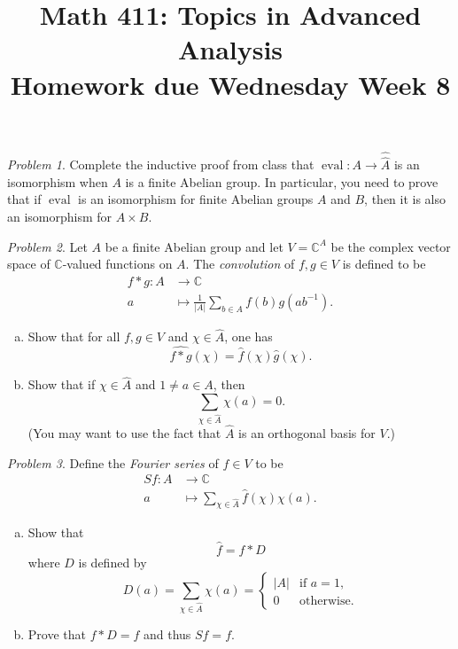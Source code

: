\documentclass[11pt,twoside]{amsart}
\title{Math 411: Topics in Advanced Analysis\\ Homework due Wednesday Week 8}
\theoremstyle{plain}
\theoremstyle{remark}
\newtheorem{prob}{Problem}
\theoremstyle{definition}
\theoremstyle{definition}
\newcommand{\CC}{\mathbb{C}}
\newcommand{\eval}{\operatorname{eval}}
\begin{document}
\maketitle

\begin{prob}
Complete the inductive proof from class that $\eval\colon A\to \hat{\hat A}$ is an isomorphism when $A$ is a finite Abelian group. In particular, you need to prove that if $\eval$ is an isomorphism for finite Abelian groups $A$ and $B$, then it is also an isomorphism for $A\times B$.
\end{prob}

\begin{prob}
Let $A$ be a finite Abelian group and let $V = \CC^A$ be the complex vector space of $\CC$-valued functions on $A$. The \emph{convolution} of $f,g\in V$ is defined to be
\[
\begin{aligned}
  f*g\colon A&\longrightarrow \CC\\
  a&\longmapsto \frac{1}{|A|}\sum_{b\in A}f(b)g(ab^{-1}).
\end{aligned}
\]
\begin{enumerate}[(a)]
\item Show that for all $f,g\in V$ and $\chi\in \hat A$, one has
\[
  \widehat{f*g}(\chi) = \hat f(\chi)\hat g(\chi).
\]
\item Show that if $\chi\in\hat A$ and $1\ne a\in A$, then
\[
  \sum_{\chi\in \hat A}\chi(a) = 0.
\]
(You may want to use the fact that $\hat A$ is an orthogonal basis for $V$.)
\end{enumerate}
\end{prob}

\begin{prob}
Define the \emph{Fourier series} of $f\in V$ to be
\[
\begin{aligned}
  Sf\colon A&\longrightarrow \CC\\
  a&\longmapsto \sum_{\chi\in \hat A}\hat f(\chi)\chi(a).
\end{aligned}
\]
\begin{enumerate}[(a)]
\item Show that
\[
  \hat f = f*D
\]
where $D$ is defined by
\[
  D(a) = \sum_{\chi\in \hat A} \chi(a) =
  \begin{cases}
  |A|&\text{if }a=1,\\
  0&\text{otherwise}.
  \end{cases}
\]
\item Prove that $f*D = f$ and thus $Sf=f$.
\end{enumerate}
\end{prob}
\end{document}
